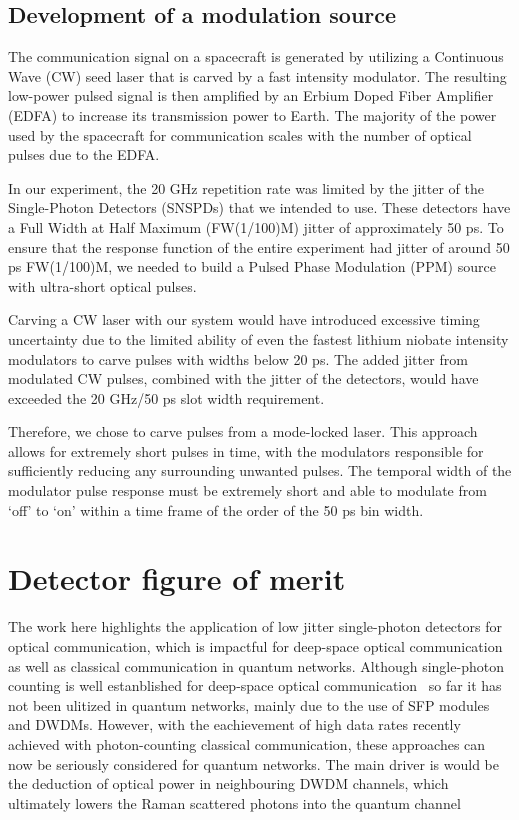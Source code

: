 \documentclass{optica-article}
\begin{document}
\hypertarget{development-of-a-modulation-source}{%
\subsection{Development of a modulation source}\label{development-of-a-modulation-source}}

The communication signal on a spacecraft is generated by utilizing a Continuous Wave (CW) seed laser that is carved by a fast intensity modulator. The resulting low-power pulsed signal is then amplified by an Erbium Doped Fiber Amplifier (EDFA) to increase its transmission power to Earth. The majority of the power used by the spacecraft for communication scales with the number of optical pulses due to the EDFA.

In our experiment, the 20 GHz repetition rate was limited by the jitter of the Single-Photon Detectors (SNSPDs) that we intended to use. These detectors have a Full Width at Half Maximum (FW(1/100)M) jitter of approximately 50 ps. To ensure that the response function of the entire experiment had jitter of around 50 ps FW(1/100)M, we needed to build a Pulsed Phase Modulation (PPM) source with ultra-short optical pulses.

Carving a CW laser with our system would have introduced excessive timing uncertainty due to the limited ability of even the fastest lithium niobate intensity modulators to carve pulses with widths below 20 ps. The added jitter from modulated CW pulses, combined with the jitter of the detectors, would have exceeded the 20 GHz/50 ps slot width requirement.

Therefore, we chose to carve pulses from a mode-locked laser. This approach allows for extremely short pulses in time, with the modulators responsible for sufficiently reducing any surrounding unwanted pulses. The temporal width of the modulator pulse response must be extremely short and able to modulate from `off' to `on' within a time frame of the order of the 50 ps bin width.

\hypertarget{Detector metrics for high-rate photon detection}{%
\section{Detector figure of merit}
\label{fom}}

The work here highlights the application of low jitter single-photon detectors for optical communication, which is impactful for deep-space optical communication as well as classical communication in quantum networks. Although single-photon counting is well estanblished for deep-space optical communication~\cite{Laser lunar, DSOC} so far it has not been ulitized in quantum networks, mainly due to the use of SFP modules and DWDMs. However, with the eachievement of high data rates recently achieved with photon-counting classical communication, these approaches can now be seriously considered for quantum networks. The main driver is would be the deduction of optical power in neighbouring DWDM channels, which ultimately lowers the Raman scattered photons into the quantum channel~\cite{EraerdsRaman}
\end{document}
